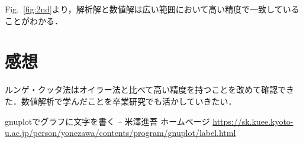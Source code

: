 \documentclass[gutter=20mm,fore-edge=20mm,head_space=30mm,foot_space=30mm]{jlreq}
\begin{document}
Fig.~\ref{fig:2nd}より，解析解と数値解は広い範囲において高い精度で一致していることがわかる．

\section{感想}
ルンゲ・クッタ法はオイラー法と比べて高い精度を持つことを改めて確認できた．数値解析で学んだことを卒業研究でも活かしていきたい．

\begin{thebibliography}{99}
  \bibitem{} gnuplotでグラフに文字を書く -- 米澤進吾 ホームページ \url{https://sk.kuee.kyoto-u.ac.jp/person/yonezawa/contents/program/gnuplot/label.html} %
\end{thebibliography}
\end{document}
